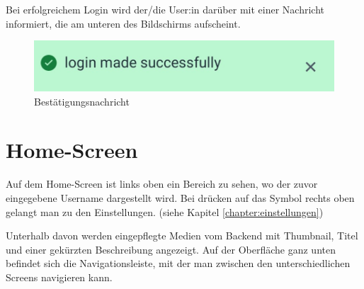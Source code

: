 Bei erfolgreichem Login wird der/die User:in darüber mit einer Nachricht informiert, die am unteren des Bildschirms 
aufscheint.

\begin{figure}[H]
    \centering
    \includegraphics[height=0.09\textwidth]{./pics/message_cut.jpg}
    \caption{Bestätigungsnachricht}
\end{figure}

\section{Home-Screen}

Auf dem Home-Screen ist links oben ein Bereich zu sehen, wo der zuvor eingegebene Username dargestellt wird. Bei drücken
auf das Symbol rechts
oben gelangt man zu den Einstellungen. (siehe Kapitel \ref{chapter:einstellungen})

Unterhalb davon werden eingepflegte Medien vom Backend mit Thumbnail, Titel und einer gekürzten Beschreibung angezeigt.
Auf der Oberfläche ganz unten befindet sich die Navigationsleiste, mit der man zwischen den unterschiedlichen Screens 
navigieren kann.


